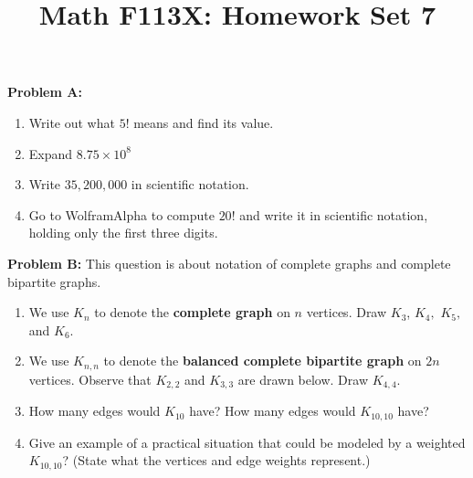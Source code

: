 \documentclass[11pt, oneside]{article}   	%
\title{Math F113X: Homework Set 7}
\date{}							%
\begin{document}
\maketitle

\vspace{-1.5cm}



\vfill

\textbf{Problem A:} 
\begin{enumerate}
\item Write out what $5!$ means and find its value.
\item Expand $8.75 \times 10^8$
\item Write $35,200,000$ in scientific notation.
\item Go to WolframAlpha to compute $20!$ and write it in scientific notation, holding only the first three digits.\\
\end{enumerate}
\vfill

\textbf{Problem B:} This question is about notation of complete graphs and complete bipartite graphs.\\
	\begin{enumerate}
	\item We use $K_n$ to denote the \textbf{complete graph} on $n$ vertices. Draw $K_3$, $K_4,$ $K_5,$ and $K_6.$
	\item We use $K_{n,n}$ to denote the \textbf{balanced complete bipartite graph} on $2n$ vertices. Observe that $K_{2,2}$ and $K_{3,3}$ are drawn below. Draw $K_{4,4}.$\\

	\item How many edges would $K_{10}$ have? How many edges would $K_{10,10}$ have?
	\item Give an example of a practical situation that could be modeled by a weighted $K_{10,10}$? (State what the vertices and edge weights represent.)\\
	\end{enumerate}
	
\end{document}
